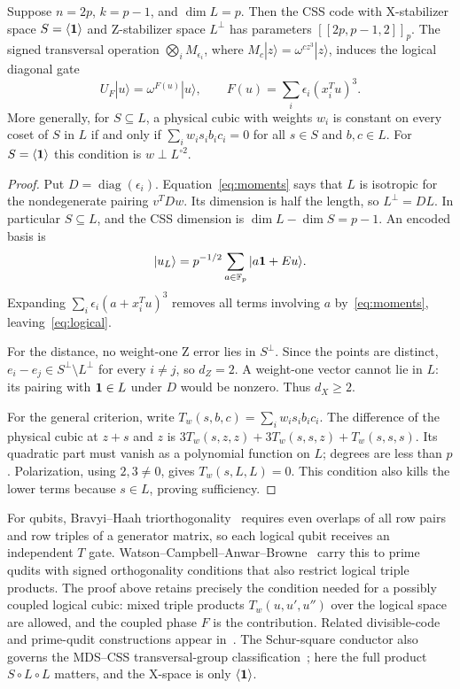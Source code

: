 \begin{theorem}\label{thm:trade-code}
Suppose $n=2p$, $k=p-1$, and $\dim L=p$. Then the CSS code with
X-stabilizer space $S=\langle\mathbf 1\rangle$ and Z-stabilizer space $L^\perp$
has parameters $[[2p,p-1,2]]_p$. The signed transversal operation
$\bigotimes_i M_{\epsilon_i}$, where $M_c|z\rangle=\omega^{cz^3}|z\rangle$,
induces the logical diagonal gate
\begin{equation}\label{eq:logical}
 U_F|u\rangle=\omega^{F(u)}|u\rangle,\qquad
 F(u)=\sum_i\epsilon_i(x_i^Tu)^3.
\end{equation}
More generally, for $S\subseteq L$, a physical cubic with weights $w_i$
is constant on every coset of $S$ in $L$ if and only if
$\sum_i w_i s_i b_i c_i=0$ for all $s\in S$ and $b,c\in L$.
For $S=\langle\mathbf 1\rangle$ this condition is $w\perp L^{\circ2}$.
\end{theorem}
\begin{proof}
Put $D=\operatorname{diag}(\epsilon_i)$. Equation~\eqref{eq:moments}
says that $L$ is isotropic for the nondegenerate pairing $v^TDw$.
Its dimension is half the length, so $L^\perp=DL$. In particular
$S\subseteq L$, and the CSS dimension is $\dim L-\dim S=p-1$.
An encoded basis is
\[
 |u_L\rangle=p^{-1/2}\sum_{a\in\mathbb F_p}|a\mathbf 1+Eu\rangle.
\]
Expanding $\sum_i\epsilon_i(a+x_i^Tu)^3$ removes all terms involving $a$
by~\eqref{eq:moments}, leaving~\eqref{eq:logical}.

For the distance, no weight-one Z error lies in $S^\perp$.
Since the points are distinct, $e_i-e_j\in S^\perp\setminus L^\perp$
for every $i\ne j$, so $d_Z=2$. A weight-one vector cannot lie in $L$:
its pairing with $\mathbf 1\in L$ under $D$ would be nonzero. Thus $d_X\geq2$.

For the general criterion, write $T_w(s,b,c)=\sum_i w_i s_i b_i c_i$.
The difference of the physical cubic at $z+s$ and $z$ is
$3T_w(s,z,z)+3T_w(s,s,z)+T_w(s,s,s)$. Its quadratic part must vanish
as a polynomial function on $L$; degrees are less than $p$.
Polarization, using $2,3\ne0$, gives $T_w(s,L,L)=0$.
This condition also kills the lower terms because $s\in L$, proving sufficiency.
\end{proof}

For qubits, Bravyi--Haah triorthogonality~\cite[Definition 1]{bravyihaah}
requires even overlaps of all row pairs and row triples of a generator matrix,
so each logical qubit receives an independent $T$ gate.
Watson--Campbell--Anwar--Browne~\cite[Definition 2 and Lemmas 6--8]{watson}
carry this to prime qudits with signed orthogonality conditions that also
restrict logical triple products.
The proof above retains precisely the condition needed for a possibly coupled
logical cubic: mixed triple products $T_w(u,u',u'')$ over the logical space are
allowed, and the coupled phase $F$ is the contribution. Related divisible-code and prime-qudit constructions
appear in~\cite{haah,cab,krishna}. The Schur-square conductor also governs the
MDS--CSS transversal-group classification~\cite{mds}; here the full product
$S\circ L\circ L$ matters, and the X-space is only $\langle\mathbf 1\rangle$.


